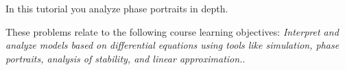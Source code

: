 %
% 
%
		
		
\begin{objectives}
	In this tutorial you analyze phase portraits in depth.

	These problems relate to the following course learning objectives:
	\textit{Interpret and analyze models based on differential equations using tools like simulation, phase
	portraits, analysis of stability, and linear approximation.}.
\end{objectives}

	\vspace{-1em}
